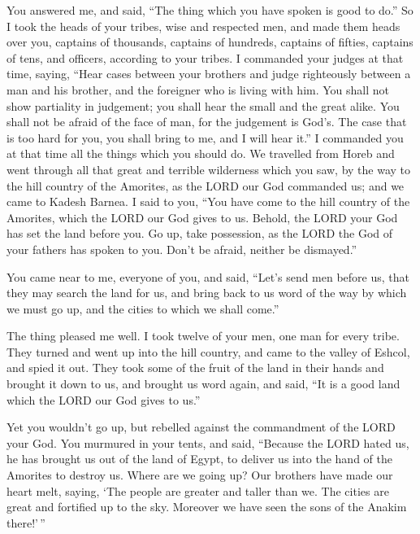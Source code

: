  You answered me, and said, ``The thing which you have
spoken is good to do.''  So I took the heads of your
tribes, wise and respected men, and made them heads over you, captains
of thousands, captains of hundreds, captains of fifties, captains of
tens, and officers, according to your tribes.  I
commanded your judges at that time, saying, ``Hear cases between your
brothers and judge righteously between a man and his brother, and the
foreigner who is living with him.  You shall not show
partiality in judgement; you shall hear the small and the great alike.
You shall not be afraid of the face of man, for the judgement is God's.
The case that is too hard for you, you shall bring to me, and I will
hear it.''  I commanded you at that time all the things
which you should do.  We travelled from Horeb and went
through all that great and terrible wilderness which you saw, by the way
to the hill country of the Amorites, as the LORD our God commanded us;
and we came to Kadesh Barnea.  I said to you, ``You have
come to the hill country of the Amorites, which the LORD our God gives
to us.  Behold, the LORD your God has set the land before
you. Go up, take possession, as the LORD the God of your fathers has
spoken to you. Don't be afraid, neither be dismayed.''

 You came near to me, everyone of you, and said, ``Let's
send men before us, that they may search the land for us, and bring back
to us word of the way by which we must go up, and the cities to which we
shall come.''

 The thing pleased me well. I took twelve of your men,
one man for every tribe.  They turned and went up into
the hill country, and came to the valley of Eshcol, and spied it out.
 They took some of the fruit of the land in their hands
and brought it down to us, and brought us word again, and said, ``It is
a good land which the LORD our God gives to us.''

 Yet you wouldn't go up, but rebelled against the
commandment of the LORD your God.  You murmured in your
tents, and said, ``Because the LORD hated us, he has brought us out of
the land of Egypt, to deliver us into the hand of the Amorites to
destroy us.  Where are we going up? Our brothers have
made our heart melt, saying, `The people are greater and taller than we.
The cities are great and fortified up to the sky. Moreover we have seen
the sons of the Anakim there!'\,''

